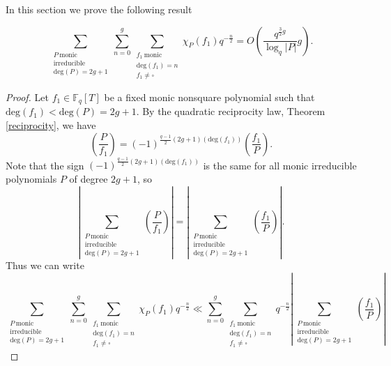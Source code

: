 \documentclass[11pt]{amsart}
\begin{document}
In this section we prove the following result
\begin{prop}
\label{prop3.3}
\begin{equation}
\sum_{\substack{P \ \mathrm{monic} \\ \mathrm{irreducible} \\ \mathrm{deg}(P)=2g+1}}\sum_{n=0}^{g}\sum_{\substack{f_{1} \ \mathrm{monic} \\ \mathrm{deg}(f_{1})=n \\ f_{1}\neq\square}}\chi_{P}(f_{1})q^{-\tfrac{n}{2}}=O\left(\frac{q^{\tfrac{3}{2}g}}{\log_{q}|P|}g\right).\nonumber
\end{equation}
\end{prop}
\begin{proof}
Let $f_{1}\in\mathbb{F}_{q}[T]$ be a fixed monic nonsquare polynomial such that $\mathrm{deg}(f_{1})<\mathrm{deg}(P)=2g+1$. By the quadratic reciprocity law, Theorem \ref{reciprocity}, we have
\begin{equation}
\left(\frac{P}{f_{1}}\right)=(-1)^{\tfrac{q-1}{2}(2g+1)(\mathrm{deg}(f_{1}))}\left(\frac{f_{1}}{P}\right).
\end{equation}
Note that the sign $(-1)^{\tfrac{q-1}{2}(2g+1)(\mathrm{deg}(f_{1}))}$ is the same for all monic irreducible polynomials $P$ of degree $2g+1$, so
\begin{equation}
\left|\sum_{\substack{P \ \mathrm{monic} \\ \mathrm{irreducible} \\ \mathrm{deg}(P)=2g+1}}\left(\frac{P}{f_{1}}\right)\right|=\left|\sum_{\substack{P \ \mathrm{monic} \\ \mathrm{irreducible} \\ \mathrm{deg}(P)=2g+1}}\left(\frac{f_{1}}{P}\right)\right|.
\end{equation}
Thus we can write
\begin{equation}
\sum_{\substack{P \ \mathrm{monic} \\ \mathrm{irreducible} \\ \mathrm{deg}(P)=2g+1}}\sum_{n=0}^{g}\sum_{\substack{f_{1} \ \mathrm{monic} \\ \mathrm{deg}(f_{1})=n \\ f_{1}\neq\square}}\chi_{P}(f_{1})q^{-\tfrac{n}{2}}\ll\sum_{n=0}^{g}\sum_{\substack{f_{1} \ \mathrm{monic} \\ \mathrm{deg}(f_{1})=n \\ f_{1}\neq\square}}q^{-\tfrac{n}{2}}\left|\sum_{\substack{P \ \mathrm{monic} \\ \mathrm{irreducible} \\ \mathrm{deg}(P)=2g+1}}\left(\frac{f_{1}}{P}\right)\right|\nonumber

\end{equation}
\end{proof}
\end{document}
